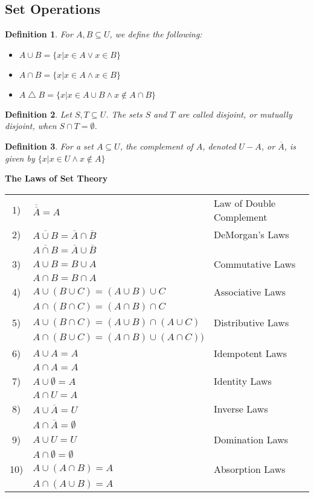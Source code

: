 \documentclass[12pt]{article}
\newtheorem{definition}{Definition} [section]
\begin{document}
\subsection{Set Operations}
\begin{definition} \emph{For $A, B \subseteq U$, we define the following:}
\begin{itemize}
\item $A \cup B = \{x|x \in A \vee x \in B\}$
\item $A \cap B = \{x|x \in A \wedge x \in B\}$
\item $A \bigtriangleup B = \{x|x \in A \cup B \wedge x \notin A \cap B\}$
\end{itemize}
\end{definition}
\begin{definition}\emph{Let $S, T \subseteq U$. The sets $S$ and $T$ are called }disjoint, \emph{or }mutually disjoint, \emph{when $S \cap T = \emptyset$.}\end{definition}
\begin{definition}\emph{For a set $A \subseteq U$, the }complement \emph{of $A$, denoted $U-A$, or $\overline{A}$, is given by $\{x|x\in U \wedge x \notin A\}$}\end{definition}
\begin{center}
\textbf{The Laws of Set Theory}
\end{center}
\begin{tabular}  {c l l}
1) & $\overline{\overline{A}} = A$ & Law of Double Complement\\
2) & $\overline{A \cup B} = \overline{A} \cap \overline{B}$ & DeMorgan's Laws\\
& $\overline{A \cap B} = \overline{A} \cup \overline{B}$\\
3) & $A \cup B = B \cup A$ & Commutative Laws\\
& $A \cap B = B \cap A$\\
4) & $A \cup (B \cup C) = (A \cup B) \cup C$ & Associative Laws\\
& $A \cap (B \cap C) = (A \cap B) \cap C$\\
5) & $A \cup (B \cap C) = (A \cup B) \cap (A \cup C)$ & Distributive Laws\\
& $A \cap (B \cup C) = (A \cap B) \cup (A \cap C))$\\
6) & $A \cup A = A$ & Idempotent Laws\\
& $A \cap A = A$\\
7) & $A \cup \emptyset = A$ & Identity Laws\\
& $A \cap U = A$\\
8) & $A \cup \overline{A} = U$ & Inverse Laws\\
& $A \cap \overline{A} = \emptyset$\\
9) & $A \cup U = U$ & Domination Laws\\
& $A \cap \emptyset = \emptyset$\\
10) & $A \cup (A \cap B) = A$ & Absorption Laws\\
& $A \cap (A \cup B) = A$
\end{tabular}
\end{document}
